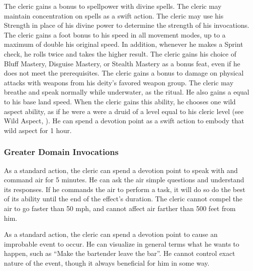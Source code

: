             The cleric gains a  bonus to spellpower with divine spells.
            The cleric may maintain concentration on  spells as a swift action.
            The cleric may use his Strength in place of his divine power to determine the strength of his invocations.
            The cleric gains a  foot bonus to his speed in all movement modes, up to a maximum of double his original speed.
            In addition, whenever he makes a Sprint check, he rolls twice and takes the higher result.
            The cleric gains his choice of Bluff Mastery, Disguise Mastery, or Stealth Mastery as a bonus feat, even if he does not meet the prerequisites.
            The cleric gains a  bonus to damage on physical attacks with weapons from his deity's favored weapon group.
             The cleric may breathe and speak normally while underwater, as the 
            ritual.
            He also gains a  equal to his base land speed.
            When the cleric gains this ability, he chooses one wild aspect ability, as if he were a were a druid of a level equal to his cleric level (see Wild Aspect, ).
            He can spend a devotion point as a swift action to embody that wild aspect for 1 hour.

        \subsubsection{Greater Domain Invocations}\label{Greater Domain Invocations}

            As a standard action, the cleric can spend a devotion point to speak with and command air for 5 minutes.
            He can ask the air simple questions and understand its responses.
            If he commands the air to perform a task, it will do so do the best of its ability until the end of the effect's duration.
            The cleric cannot compel the air to go faster than 50 mph, and cannot affect air farther than 500 feet from him.

            As a standard action, the cleric can spend a devotion point to cause an improbable event to occur.
            He can visualize in general terms what he wants to happen, such as ``Make the bartender leave the bar''.
            He cannot control exact nature of the event, though it always beneficial for him in some way.

